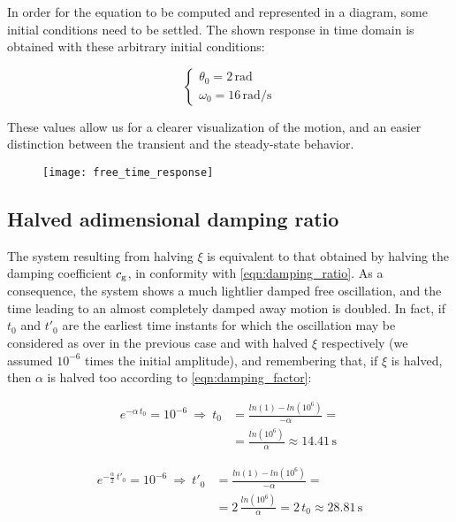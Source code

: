 \documentclass[a4paper,12pt,oneside]{article}
\begin{document}
In order for the equation to be computed and represented in a diagram, some initial conditions need to be settled. The shown response in time domain is obtained with these arbitrary initial conditions:

\[ \begin{cases}
	\theta_0 = 2 \, \text{rad} \\
	\omega_0 = 16 \, \text{rad/s}
\end{cases} \]

These values allow us for a clearer visualization of the motion, and an easier distinction between the transient and the steady-state behavior.

\begin{figure}[H]
	\hspace{-30pt}
	\texttt{[image: free\_time\_response]}
\end{figure}

\subsection{Halved adimensional damping ratio}

The system resulting from halving $ \xi $ is equivalent to that obtained by halving the damping coefficient $ c_\textup{g} $, in conformity with \eqref{eqn:damping_ratio}. As a consequence, the system shows a much lightlier damped free oscillation, and the time leading to an almost completely damped away motion is doubled. In fact, if $ t_0 $ and $ t'_0 $ are the earliest time instants for which the oscillation may be considered as over in the previous case and with halved $ \xi $ respectively (we assumed $ 10^{-6} $ times the initial amplitude), and remembering that, if $ \xi $ is halved, then $ \alpha $ is halved too according to \eqref{eqn:damping_factor}:

\[ \begin{split}
	e^{-\alpha \, t_0} = 10^{-6} ~ \Rightarrow ~
		t_0 & = \frac{ln(1) - ln(10^6)}{-\alpha} = \\
				& = \frac{ln(10^6)}{\alpha} \approx 14.41 \, \text{s}
\end{split} \]

\[ \begin{split}
	e^{-\frac{\alpha}{2} \, t'_0} = 10^{-6} ~ \Rightarrow ~
		t'_0 & = \frac{ln(1) - ln(10^6)}{-\alpha} = \\
				 & = 2 \, \frac{ln(10^6)}{\alpha} = 2 \, t_0 \approx 28.81 \, \text{s}
\end{split} \]
\end{document}
